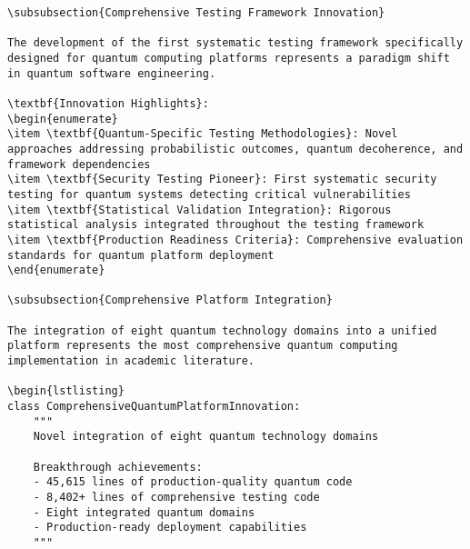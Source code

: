 \documentclass[12pt,a4paper]{report}
\begin{document}
\begin{lstlisting}
\subsubsection{Comprehensive Testing Framework Innovation}

The development of the first systematic testing framework specifically designed for quantum computing platforms represents a paradigm shift in quantum software engineering.

\textbf{Innovation Highlights}:
\begin{enumerate}
\item \textbf{Quantum-Specific Testing Methodologies}: Novel approaches addressing probabilistic outcomes, quantum decoherence, and framework dependencies
\item \textbf{Security Testing Pioneer}: First systematic security testing for quantum systems detecting critical vulnerabilities
\item \textbf{Statistical Validation Integration}: Rigorous statistical analysis integrated throughout the testing framework
\item \textbf{Production Readiness Criteria}: Comprehensive evaluation standards for quantum platform deployment
\end{enumerate}

\subsubsection{Comprehensive Platform Integration}

The integration of eight quantum technology domains into a unified platform represents the most comprehensive quantum computing implementation in academic literature.

\begin{lstlisting}
class ComprehensiveQuantumPlatformInnovation:
    """
    Novel integration of eight quantum technology domains

    Breakthrough achievements:
    - 45,615 lines of production-quality quantum code
    - 8,402+ lines of comprehensive testing code
    - Eight integrated quantum domains
    - Production-ready deployment capabilities
    """


\end{lstlisting}
\end{document}
